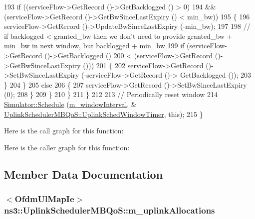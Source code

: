 \begin{DoxyCode}
193               \textcolor{keywordflow}{if} ((serviceFlow->GetRecord ()->GetBacklogged () > 0)
194                   && (serviceFlow->GetRecord ()->GetBwSinceLastExpiry () < min\_bw))
195                 \{
196                   serviceFlow->GetRecord ()->UpdateBwSinceLastExpiry (-min\_bw);
197 
198                   \textcolor{comment}{// if backlogged < granted\_bw then we don't need to provide granted\_bw + min\_bw in next
       window, but backlogged + min\_bw}
199                   \textcolor{keywordflow}{if} (serviceFlow->GetRecord ()->GetBacklogged ()
200                       < (serviceFlow->GetRecord ()->GetBwSinceLastExpiry ()))
201                     \{
202                       serviceFlow->GetRecord ()->SetBwSinceLastExpiry (-serviceFlow->GetRecord ()->
      GetBacklogged ());
203                     \}
204                 \}
205               \textcolor{keywordflow}{else}
206                 \{
207                   serviceFlow->GetRecord ()->SetBwSinceLastExpiry (0);
208                 \}
209             \}
210         \}
211     \}
212 
213   \textcolor{comment}{// Periodically reset window}
214   \hyperlink{classns3_1_1Simulator_a671882c894a08af4a5e91181bf1eec13}{Simulator::Schedule} (\hyperlink{classns3_1_1UplinkSchedulerMBQoS_aa3fb881e781d8cda4e7bb011c30d9f5d}{m\_windowInterval}, &
      \hyperlink{classns3_1_1UplinkSchedulerMBQoS_a80733614c419c105ae666e830f1d5c1e}{UplinkSchedulerMBQoS::UplinkSchedWindowTimer}, \textcolor{keyword}{this});
215 \}
\end{DoxyCode}


Here is the call graph for this function\+:




Here is the caller graph for this function\+:




\subsection{Member Data Documentation}
\subsubsection[{\texorpdfstring{m\+\_\+uplink\+Allocations}{m_uplinkAllocations}}]{$<${\bf Ofdm\+Ul\+Map\+Ie}$>$ ns3\+::\+Uplink\+Scheduler\+M\+B\+Qo\+S\+::m\+\_\+uplink\+Allocations\hspace{0.3cm}{\ttfamily [private]}}\hypertarget{classns3_1_1UplinkSchedulerMBQoS_afdca0f835bd9f2b31ad19a7a2a2f4382}{}\label{classns3_1_1UplinkSchedulerMBQoS_afdca0f835bd9f2b31ad19a7a2a2f4382}


